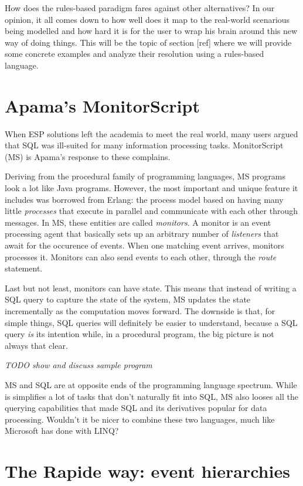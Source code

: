 \documentclass{report}
\begin{document}
How does the rules-based paradigm fares against other alternatives? In our opinion, it all comes down to how well does it map to the real-world scenarious being modelled and how hard it is for the user to wrap his brain around this new way of doing things. This will be the topic of section [ref] where we will provide some concrete examples and analyze their resolution using a rules-based language.

\section{Apama's MonitorScript}

When ESP solutions left the academia to meet the real world, many users argued that SQL was ill-suited for many information processing tasks. MonitorScript (MS) is Apama's response to these complains.

Deriving from the procedural family of programming languages, MS programs look a lot like Java programs. However, the most important and unique feature it includes was borrowed from Erlang: the process model based on having many little \emph{processes} that execute in parallel and communicate with each other through messages. In MS, these entities are called \emph{monitors}. A monitor is an event processing agent that basically sets up an arbitrary number of \emph{listeners} that await for the occurence of events. When one matching event arrives, monitors processes it. Monitors can also send events to each other, through the \emph{route} statement.

Last but not least, monitors can have state. This means that instead of writing a SQL query to capture the state of the system, MS updates the state incrementally as the computation moves forward. The downside is that, for simple things, SQL queries will definitely be easier to understand, because a SQL query \emph{is} its intention while, in a procedural program, the big picture is not always that clear.

\emph{TODO show and discuss sample program}

MS and SQL are at opposite ends of the programming language spectrum. While is simplifies a lot of tasks that don't naturally fit into SQL, MS also looses all the querying capabilities that made SQL and its derivatives popular for data processing. Wouldn't it be nicer to combine these two languages, much like Microsoft has done with LINQ?

\section{The Rapide way: event hierarchies}
\end{document}

